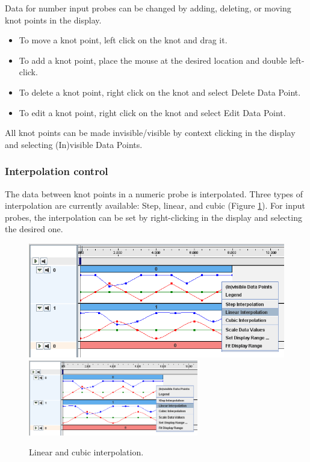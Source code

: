 \documentclass{article}
\begin{document}
Data for number input probes can be changed by adding, deleting, or
moving knot points in the display.

\begin{itemize}

\item To move a knot point, left click on the knot and drag it.

\item To add a knot point, place the mouse at the desired location
and double left-click.

\item To delete a knot point, right click on the knot and select 
{\sf Delete Data Point}.

\item To edit a knot point, right click on the knot and select 
{\sf Edit Data Point}.

\end{itemize}

All knot points can be made invisible/visible by context clicking in the 
display and selecting {\sf (In)visible Data Points}.

\subsubsection{Interpolation control}

The data between knot points in a numeric probe is interpolated.
Three types of interpolation are currently available: Step, linear,
and cubic (Figure \ref{interpolationFig}). For input probes, the interpolation
can be set by right-clicking in the display and selecting the desired
one.

\begin{figure}
\begin{center}
\iflatexml
\includegraphics[]{images/interpolation}
\else
\includegraphics[width=0.66\textwidth]{images/interpolation}
\fi
\end{center}
\caption{Linear and cubic interpolation.}%
\label{interpolationFig}
\end{figure}
\end{document}
